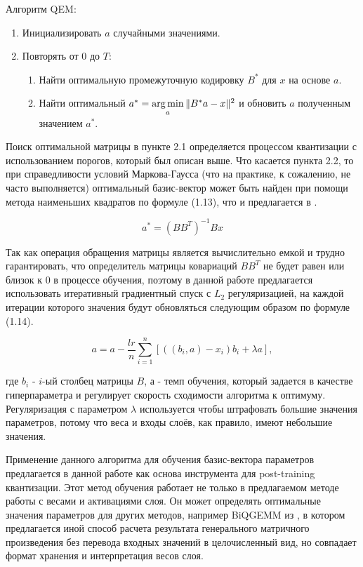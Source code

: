Алгоритм QEM:
\begin{enumerate}[label=\arabic*.]
    \item Инициализировать $a$ случайными значениями.
    \item Повторять от $0$ до $T$:
    \begin{enumerate}[label=\arabic*.]
    \item Найти оптимальную промежуточную кодировку $B^*$ для $x$ на основе $a$.
    \item Найти оптимальный $a^* = \operatorname*{arg\,min} \limits_a \| B^* a - x \|^2$ и обновить $a$ полученным значением $a^*$.
    \end{enumerate}
\end{enumerate}

Поиск оптимальной матрицы в пункте 2.1 определяется процессом квантизации с использованием порогов, который был описан выше. Что касается пункта 2.2, то при справедливости условий Маркова-Гаусса (что на практике, к сожалению, не часто выполняется) оптимальный базис-вектор может быть найден при помощи метода наименьших квадратов по формуле (1.13), что и предлагается в \cite{lq}. 

\begin{equation}
a^* = (B B^T)^{-1} Bx
\end{equation}

Так как операция обращения матрицы является вычислительно емкой и трудно гарантировать, что определитель матрицы ковариаций $B B^T$ не будет равен или близок к $0$ в процессе обучения, поэтому в данной работе предлагается использовать итеративный градиентный спуск с $L_2$ регуляризацией, на каждой итерации которого значения будут обновляться следующим образом по формуле (1.14).

\begin{equation}
a = a - \frac{lr}{n} \sum \limits_{i = 1}^{n} [((b_i, a) - x_i)b_i + \lambda a],
\end{equation}

где $b_i$ - $i$-ый столбец матрицы $B$, $а$ - темп обучения, который задается в качестве гиперпараметра и регулирует скорость сходимости алгоритма к оптимуму. Регуляризация с параметром $\lambda$ используется чтобы штрафовать большие значения параметров, потому что веса и входы слоёв, как правило, имеют небольшие значения.

Применение данного алгоритма для обучения базис-вектора параметров предлагается в данной работе как основа инструмента для post-training квантизации. Этот метод обучения работает не только в предлагаемом методе работы с весами и активациями слоя. Он может определять оптимальные значения параметров для других методов, например BiQGEMM из \cite{bqgemm},  в котором предлагается иной способ  расчета результата генерального матричного произведения без перевода входных значений в целочисленный вид, но совпадает формат хранения и интерпретация весов слоя. 